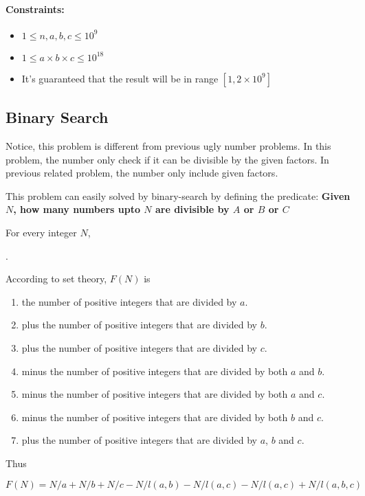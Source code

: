  

\paragraph{Constraints:}

\begin{itemize}
\item $1 \leq n, a, b, c \leq 10^9$
\item $1 \leq a \times b \times c \leq 10^{18}$
\item It's guaranteed that the result will be in range $[1, 2 \times 10^9]$
\end{itemize}

\subsection{Binary Search}
Notice, this problem is different from previous ugly number problems. In this problem, the number only check if it can be divisible by the given factors. In previous related problem, the number only include given factors. 

 
This problem can easily solved by binary-search by defining the predicate: \textbf{Given $N$, how many numbers upto $N$ are divisible by $A$ or $B$ or $C$}

For every integer $N$,

.

According to set theory, 
$F(N)$ is 
\begin{enumerate}
\item the number of positive integers that are divided by $a$. 
\item plus the number of positive integers that are divided by $b$.
\item plus the number of positive integers that are divided by $c$.
\item minus the number of positive integers that are divided by both $a$ and $b$.
\item minus the number of positive integers that are divided by both $a$ and $c$.
\item minus the number of positive integers that are divided by both $b$ and $c$.
\item plus the number of positive integers that are divided by $a$, $b$ and $c$.
\end{enumerate}

Thus 

$F(N) = N/a+N/b+N/c- N /l(a, b) - N /l(a,c) - N /l(a,c) + N/l(a,b,c)$  

